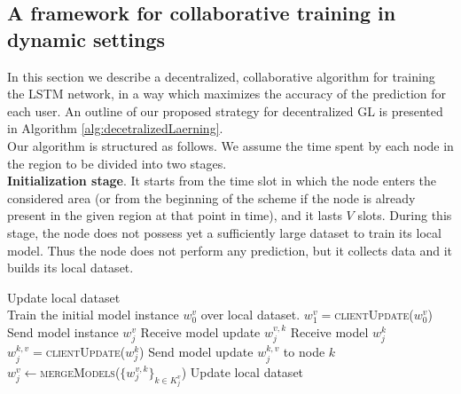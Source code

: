\documentclass[conference]{IEEEtran}
\begin{document}
\subsection{A framework for collaborative training in dynamic settings}
In this section we describe a decentralized, collaborative algorithm for training the LSTM network, in a way which maximizes the accuracy of the prediction for each user. 
An outline of our proposed strategy for decentralized GL is presented in Algorithm \ref{alg:decetralizedLaerning}.\\
Our algorithm is structured as follows. We assume the time spent by each node in the region to be divided into two stages.\\
\textbf{Initialization stage}. It starts from the time slot in which the node enters the considered area (or from the beginning of the scheme if the node is already present in the given region at that point in time), and it lasts $V$ slots. During this stage, the node does not possess yet a sufficiently large dataset to train its local model. Thus the node does not perform any prediction, but it collects data and it builds its local dataset.\\
%
\begin{algorithm} [t!]
\caption{ Decentralized GL algorithm.\\ 
$K^v_j$ is the set of nodes in their exploitation phase which come in contact with node $v$ during the $j-th$ round.}
\label{alg:decetralizedLaerning}
\small
\begin{algorithmic}
 
\State Update local dataset
\EndFor
\\  Train the initial model instance $w_0^v$ over local dataset.
\State $w_1^v=$\textsc{clientUpdate($w_0^v$)} 
 
\State Send model instance $w_j^v$ 
\State Receive model update $w_j^{v,k}$ 
\State Receive model $w_j^k$\\
\State $w_j^{k,v}=$\textsc{clientUpdate($w_j^{k}$)}
\State Send model update $w_j^{k,v}$ to node $k$ 
\EndFor\\
\State $w_j^v \gets$\textsc{mergeModels($\{w_j^{v,k}\}_{k\in K^v_j}$)} 
\State Update local dataset
\EndFor
\EndFor
\end{algorithmic}
\normalsize
\end{algorithm}
\end{document}
